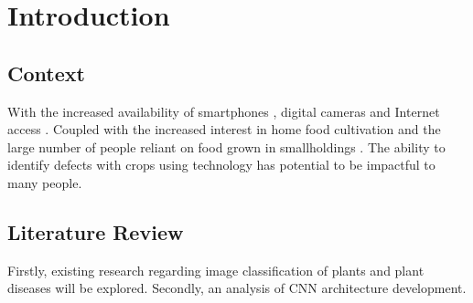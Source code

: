\chapter{Introduction}
\label{introduction}

\section{Context}
  With the increased availability of smartphones \cite{Statista:2021}, digital cameras \cite{ImarcGroup} and Internet access \cite{Wikipedia} \cite{Globaltt}. Coupled with the increased interest in home food cultivation \cite{Google} and the large number of people reliant on food grown in smallholdings \cite{JLIFADSmallHolders}. The ability to identify defects with crops using technology has potential to be impactful to many people.
\section{Literature Review}
  Firstly, existing research regarding image classification of plants and plant diseases will be explored. Secondly, an analysis of CNN architecture development.
